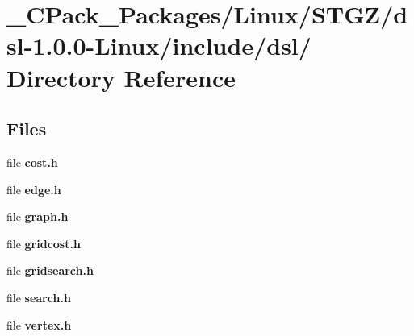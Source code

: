 \section{\_\-CPack\_\-Packages/Linux/STGZ/dsl-\/1.0.0-\/Linux/include/dsl/ Directory Reference}
\label{dir_be485240c1e7952f5ef2ed83ac360f41}
\subsection*{Files}
\begin{DoxyCompactItemize}
\item 
file {\bf cost.h}
\item 
file {\bf edge.h}
\item 
file {\bf graph.h}
\item 
file {\bf gridcost.h}
\item 
file {\bf gridsearch.h}
\item 
file {\bf search.h}
\item 
file {\bf vertex.h}
\end{DoxyCompactItemize}
